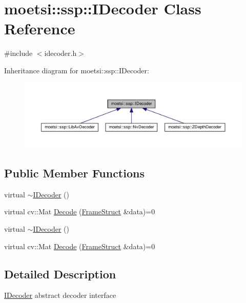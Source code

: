 \hypertarget{classmoetsi_1_1ssp_1_1IDecoder}{}\section{moetsi\+:\+:ssp\+:\+:I\+Decoder Class Reference}
\label{classmoetsi_1_1ssp_1_1IDecoder}


{\ttfamily \#include $<$idecoder.\+h$>$}



Inheritance diagram for moetsi\+:\+:ssp\+:\+:I\+Decoder\+:\nopagebreak
\begin{figure}[H]
\begin{center}
\leavevmode
\includegraphics[width=350pt]{classmoetsi_1_1ssp_1_1IDecoder__inherit__graph}
\end{center}
\end{figure}
\subsection*{Public Member Functions}
\begin{DoxyCompactItemize}
\item 
virtual \hyperlink{classmoetsi_1_1ssp_1_1IDecoder_a26dc991c2434792f50ec5ae9b61a1653}{$\sim$\+I\+Decoder} ()
\item 
virtual cv\+::\+Mat \hyperlink{classmoetsi_1_1ssp_1_1IDecoder_a1c06604dc4107d3668a4e791c13cc063}{Decode} (\hyperlink{structmoetsi_1_1ssp_1_1FrameStruct}{Frame\+Struct} \&data)=0
\item 
virtual \hyperlink{classmoetsi_1_1ssp_1_1IDecoder_a26dc991c2434792f50ec5ae9b61a1653}{$\sim$\+I\+Decoder} ()
\item 
virtual cv\+::\+Mat \hyperlink{classmoetsi_1_1ssp_1_1IDecoder_a1c06604dc4107d3668a4e791c13cc063}{Decode} (\hyperlink{structmoetsi_1_1ssp_1_1FrameStruct}{Frame\+Struct} \&data)=0
\end{DoxyCompactItemize}


\subsection{Detailed Description}
\hyperlink{classmoetsi_1_1ssp_1_1IDecoder}{I\+Decoder} abstract decoder interface 

